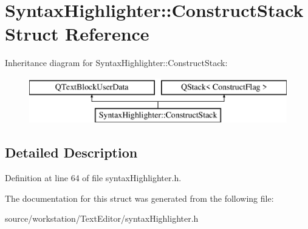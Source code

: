 \hypertarget{struct_syntax_highlighter_1_1_construct_stack}{\section{Syntax\-Highlighter\-:\-:Construct\-Stack Struct Reference}
\label{struct_syntax_highlighter_1_1_construct_stack}
}
Inheritance diagram for Syntax\-Highlighter\-:\-:Construct\-Stack\-:\begin{figure}[H]
\begin{center}
\leavevmode
\includegraphics[height=2.000000cm]{struct_syntax_highlighter_1_1_construct_stack}
\end{center}
\end{figure}


\subsection{Detailed Description}


Definition at line 64 of file syntax\-Highlighter.\-h.



The documentation for this struct was generated from the following file\-:\begin{DoxyCompactItemize}
\item 
source/workstation/\-Text\-Editor/syntax\-Highlighter.\-h\end{DoxyCompactItemize}

